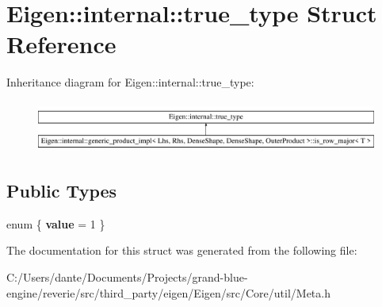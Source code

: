 \hypertarget{struct_eigen_1_1internal_1_1true__type}{}\section{Eigen\+::internal\+::true\+\_\+type Struct Reference}
\label{struct_eigen_1_1internal_1_1true__type}
Inheritance diagram for Eigen\+::internal\+::true\+\_\+type\+:\begin{figure}[H]
\begin{center}
\leavevmode
\includegraphics[height=1.694402cm]{struct_eigen_1_1internal_1_1true__type}
\end{center}
\end{figure}
\subsection*{Public Types}
\begin{DoxyCompactItemize}
\item 
\mbox{\label{struct_eigen_1_1internal_1_1true__type_a1d1eb4d775b43f6fd1dfc330b677d30a}} 
enum \{ {\bfseries value} = 1
 \}
\end{DoxyCompactItemize}


The documentation for this struct was generated from the following file\+:\begin{DoxyCompactItemize}
\item 
C\+:/\+Users/dante/\+Documents/\+Projects/grand-\/blue-\/engine/reverie/src/third\+\_\+party/eigen/\+Eigen/src/\+Core/util/Meta.\+h\end{DoxyCompactItemize}
